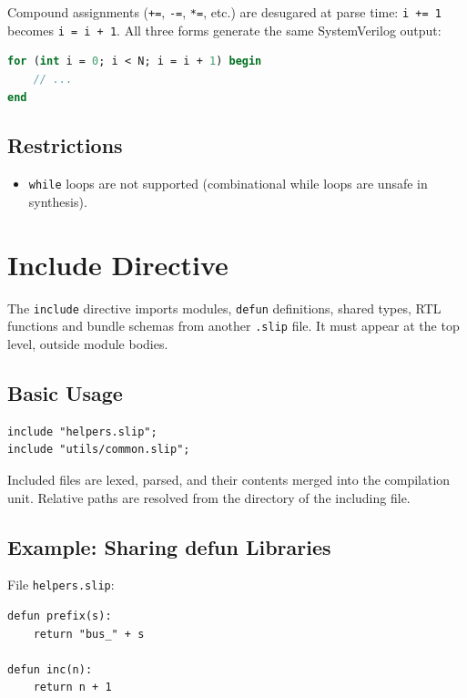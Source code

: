\documentclass[lang=en,11pt]{elegantbook}
\newcommand{\code}[1]{\texttt{#1}}
\begin{document}
Compound assignments (\code{+=}, \code{-=}, \code{*=}, etc.) are desugared at parse time: \code{i += 1} becomes \code{i = i + 1}. All three forms generate the same SystemVerilog output:

\begin{lstlisting}[language=SystemVerilog]
for (int i = 0; i < N; i = i + 1) begin
    // ...
end
\end{lstlisting}

\section{Restrictions}

\begin{itemize}
  \item \code{while} loops are not supported (combinational while loops are unsafe in synthesis).
\end{itemize}

\chapter{Include Directive}

The \code{include} directive imports modules, \code{defun} definitions, shared
types, RTL functions and bundle schemas from another \code{.slip} file.
It must appear at the top level, outside module bodies.

\section{Basic Usage}

\begin{lstlisting}[language=Slip]
include "helpers.slip";
include "utils/common.slip";
\end{lstlisting}

Included files are lexed, parsed, and their contents merged into the compilation unit. Relative paths are resolved from the directory of the including file.

\section{Example: Sharing defun Libraries}

File \code{helpers.slip}:

\begin{lstlisting}[language=Slip]
defun prefix(s):
    return "bus_" + s

defun inc(n):
    return n + 1
\end{lstlisting}
\end{document}
